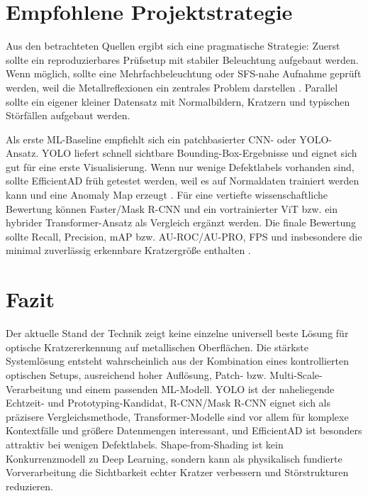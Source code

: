 \documentclass[11pt,a4paper]{article}
\begin{document}
\section{Empfohlene Projektstrategie}

Aus den betrachteten Quellen ergibt sich eine pragmatische Strategie: Zuerst sollte ein reproduzierbares Prüfsetup mit stabiler Beleuchtung aufgebaut werden. Wenn möglich, sollte eine Mehrfachbeleuchtung oder SFS-nahe Aufnahme geprüft werden, weil die Metallreflexionen ein zentrales Problem darstellen \cite{ersteinfos,projektaufgabe}. Parallel sollte ein eigener kleiner Datensatz mit Normalbildern, Kratzern und typischen Störfällen aufgebaut werden.

Als erste ML-Baseline empfiehlt sich ein patchbasierter CNN- oder YOLO-Ansatz. YOLO liefert schnell sichtbare Bounding-Box-Ergebnisse und eignet sich gut für eine erste Visualisierung. Wenn nur wenige Defektlabels vorhanden sind, sollte EfficientAD früh getestet werden, weil es auf Normaldaten trainiert werden kann und eine Anomaly Map erzeugt \cite{efficientad}. Für eine vertiefte wissenschaftliche Bewertung können Faster/Mask R-CNN und ein vortrainierter ViT bzw. ein hybrider Transformer-Ansatz als Vergleich ergänzt werden. Die finale Bewertung sollte Recall, Precision, mAP bzw. AU-ROC/AU-PRO, FPS und insbesondere die minimal zuverlässig erkennbare Kratzergröße enthalten \cite{projektaufgabe,applications_review,vit_thesis}.

\section{Fazit}

Der aktuelle Stand der Technik zeigt keine einzelne universell beste Lösung für optische Kratzererkennung auf metallischen Oberflächen. Die stärkste Systemlösung entsteht wahrscheinlich aus der Kombination eines kontrollierten optischen Setups, ausreichend hoher Auflösung, Patch- bzw. Multi-Scale-Verarbeitung und einem passenden ML-Modell. YOLO ist der naheliegende Echtzeit- und Prototyping-Kandidat, R-CNN/Mask R-CNN eignet sich als präzisere Vergleichsmethode, Transformer-Modelle sind vor allem für komplexe Kontextfälle und größere Datenmengen interessant, und EfficientAD ist besonders attraktiv bei wenigen Defektlabels. Shape-from-Shading ist kein Konkurrenzmodell zu Deep Learning, sondern kann als physikalisch fundierte Vorverarbeitung die Sichtbarkeit echter Kratzer verbessern und Störstrukturen reduzieren.
\end{document}
